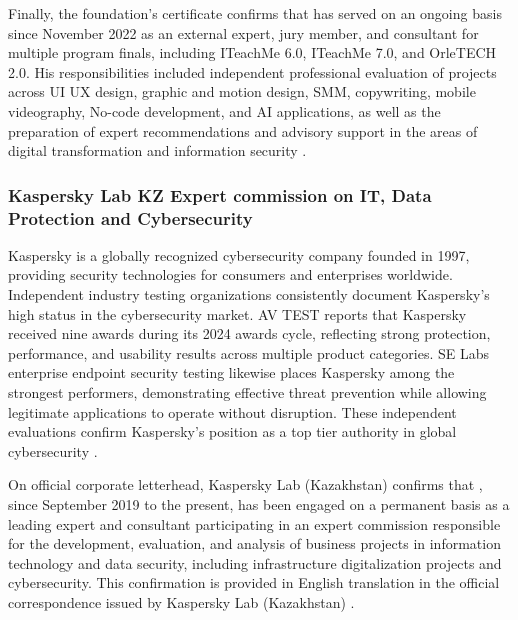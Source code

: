 Finally, the foundation’s certificate confirms that \mrl{} has served on an ongoing basis since November 2022 as an external expert, jury member, and consultant for multiple program finals, including ITeachMe 6.0, ITeachMe 7.0, and OrleTECH 2.0. His responsibilities included independent professional evaluation of projects across UI UX design, graphic and motion design, SMM, copywriting, mobile videography, No-code development, and AI applications, as well as the preparation of expert recommendations and advisory support in the areas of digital transformation and information security .


\subsubsection{Kaspersky Lab KZ Expert commission on IT, Data Protection and Cybersecurity}

\label{subsubsec:JudgingKasperskyNew}

Kaspersky is a globally recognized cybersecurity company founded in 1997, providing security technologies for consumers and enterprises worldwide. Independent industry testing organizations consistently document Kaspersky’s high status in the cybersecurity market. AV TEST reports that Kaspersky received nine awards during its 2024 awards cycle, reflecting strong protection, performance, and usability results across multiple product categories. SE Labs enterprise endpoint security testing likewise places Kaspersky among the strongest performers, demonstrating effective threat prevention while allowing legitimate applications to operate without disruption. These independent evaluations confirm Kaspersky’s position as a top tier authority in global cybersecurity .

On official corporate letterhead, Kaspersky Lab (Kazakhstan) confirms that \mrl{}, since September 2019 to the present, has been engaged on a permanent basis as a leading expert and consultant participating in an expert commission responsible for the development, evaluation, and analysis of business projects in information technology and data security, including infrastructure digitalization projects and cybersecurity. This confirmation is provided in English translation in the official correspondence issued by Kaspersky Lab (Kazakhstan) .

